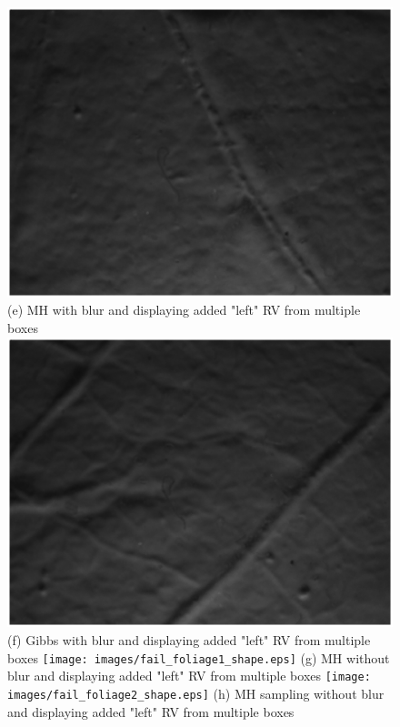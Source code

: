 \documentclass[10pt,twocolumn,letterpaper]{article}
\begin{document}
\begin{figure}[t]
\includegraphics[width=\textwidth]{images/fail_foliage1_lbp.eps}
{\small (e) MH with blur and displaying added "left" RV from multiple boxes}
\endminipage\hfill
{}
\includegraphics[width=\textwidth]{images/fail_foliage2_lbp.eps}
{\small (f) Gibbs with blur and displaying added "left" RV from multiple boxes}
\endminipage\hfill
{}
\texttt{[image: images/fail\_foliage1\_shape.eps]}
{\small (g) MH without blur and displaying added "left" RV from multiple boxes}
\endminipage\hfill
{}
\texttt{[image: images/fail\_foliage2\_shape.eps]}
{\small (h) MH sampling without blur and displaying added "left" RV
from multiple boxes}
\endminipage\\


\end{figure}
\end{document}
